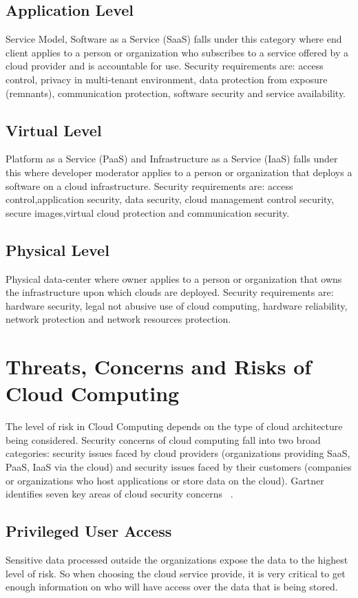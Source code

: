 \subsection{Application Level} 
Service Model, Software as a Service (SaaS) falls under this category 
where end client applies to a person or organization who subscribes
to a service offered by a cloud provider and is accountable for use. 
Security requirements are: access control, privacy in multi-tenant environment, 
data protection from exposure (remnants), communication protection, 
software security and service availability.

\subsection{Virtual Level}
Platform as a Service (PaaS) and Infrastructure as a Service (IaaS) falls 
under this where developer moderator applies to a person or organization 
that deploys a software on a cloud infrastructure. 
Security requirements are: access control,application security, data security,
cloud management control security, secure images,virtual cloud protection 
and communication security.

\subsection{Physical Level}
Physical data-center where owner applies to a person or organization 
that owns the infrastructure upon which clouds are deployed. 
Security requirements are: hardware security, legal not abusive 
use of cloud computing, hardware reliability, network protection 
and network resources protection.

\section{Threats, Concerns and Risks of Cloud Computing}
The level of risk in Cloud Computing depends on the type of cloud 
architecture being considered. Security concerns of cloud computing 
fall into two broad categories: security issues faced by cloud providers 
(organizations providing SaaS, PaaS, IaaS via the cloud) and 
security issues faced by their customers (companies or organizations who 
host applications or store data on the cloud). Gartner identifies seven key
areas of cloud security concerns ~\cite{hid-sp18-513-gartner}.

\subsection{Privileged User Access}
Sensitive data processed outside the organizations expose the data to the
highest level of risk. So when choosing the cloud service provide, it is
very critical to get enough information on who will have access over the data
that is being stored.

